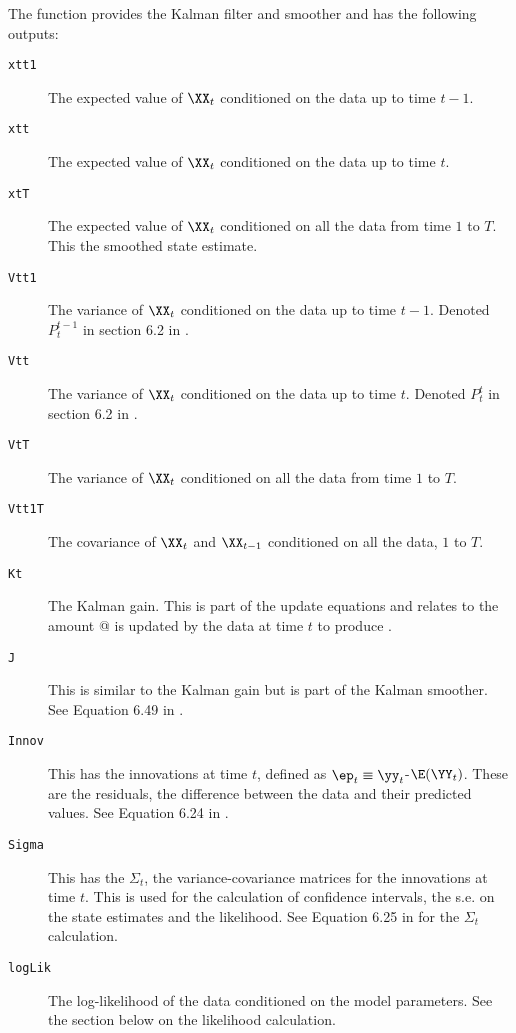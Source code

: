 The \verb@MARSSkf@{} function provides the Kalman filter and smoother and has the following outputs:
\begin{description}
\item[\texttt{xtt1 }] The expected value of $\XX_t$ conditioned on the data up to time $t-1$.
\item[\texttt{xtt  }] The expected value of $\XX_t$ conditioned on the data up to time $t$.
\item[\texttt{xtT  }] The expected value of $\XX_t$ conditioned on all the data from time $1$ to $T$.  This the smoothed state estimate.
\item[\texttt{Vtt1 }] The variance of $\XX_t$ conditioned on the data up to time $t-1$.  Denoted $P_t^{t-1}$ in section 6.2 in \citet{ShumwayStoffer2006}.
\item[\texttt{Vtt  }] The variance of $\XX_t$ conditioned on the data up to time $t$. Denoted $P_t^t$ in section 6.2 in \citet{ShumwayStoffer2006}.
\item[\texttt{VtT  }] The variance of $\XX_t$ conditioned on all the data from time $1$ to $T$.
\item[\texttt{Vtt1T}] The covariance of $\XX_t$ and $\XX_{t-1}$ conditioned on all the data, $1$ to $T$.
\item[\texttt{Kt   }] The Kalman gain.  This is part of the update equations and relates to the amount @ is updated by the data at time $t$ to produce \verb@xtt@.
\item[\texttt{J    }] This is similar to the Kalman gain but is part of the Kalman smoother.  See Equation 6.49 in \citet{ShumwayStoffer2006}.
\item[\texttt{Innov}] This has the innovations at time $t$, defined as $\ep_t \equiv \yy_t$-$\E(\YY_t)$.  These are the residuals, the difference between the data and their predicted values.  See Equation 6.24 in \citet{ShumwayStoffer2006}.
\item[\texttt{Sigma}] This has the $\Sigma_t$, the variance-covariance matrices for the innovations at time $t$.  This is used for the calculation of confidence intervals, the s.e. on the state estimates and the likelihood.  See Equation 6.25 in \citet{ShumwayStoffer2006} for the $\Sigma_t$ calculation.
\item[\texttt{logLik}] The log-likelihood of the data conditioned on the model parameters.  See the section below on the likelihood calculation.
\end{description}

